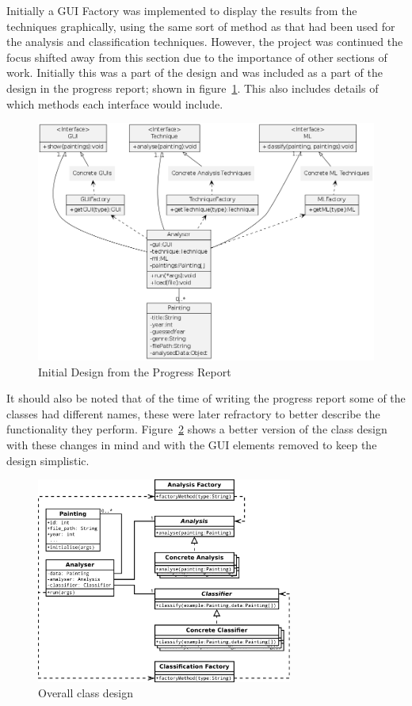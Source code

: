 Initially a GUI Factory was implemented to display the results from the techniques graphically, 
using the same sort of method as that had been used for the analysis and classification 
techniques. However, the project was continued the focus shifted away from this section due to
the importance of other sections of work. Initially this was a part of the design and was included 
as a part of the design in the progress report; shown in figure~\ref{fig:prog-design}. This also 
includes details of which methods each interface would include.


\begin{figure}[h!]
\centering
\includegraphics[width=\textwidth]{../ProgressReport/img/design.png}
\caption{Initial Design from the Progress Report}\label{fig:prog-design}
\end{figure}

It should also be noted that of the time of writing the progress report some of the classes had
different names, these were later refractory to better describe the functionality they perform.
Figure~\ref{fig:uml} shows a better version of the class design with these changes in mind and
with the GUI elements removed to keep the design simplistic.

\begin{figure}[h]
\centering
\includegraphics[width=0.75\textwidth]{img/uml}
\caption{Overall class design}\label{fig:uml}
\end{figure}

